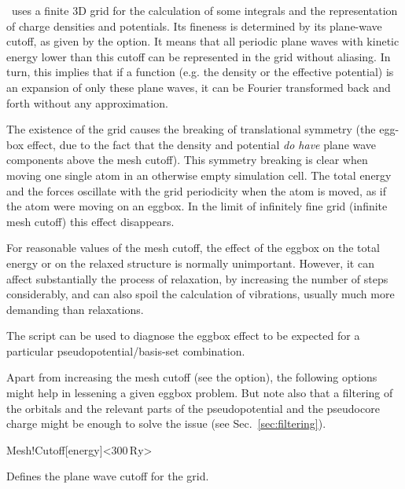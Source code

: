 \siesta\ uses a finite 3D grid for the calculation of some
integrals and the representation of charge densities and potentials.
Its fineness is determined by its plane-wave cutoff, as
given by the  option. It means that all periodic
plane waves with kinetic energy lower than this cutoff 
can be represented in the grid without aliasing. In turn,
this implies that if a function (e.g. the density or the 
effective potential) is an expansion of
only these plane waves, it can be Fourier transformed
back and forth without any approximation.

The existence of the grid causes the breaking of translational
symmetry (the egg-box effect, due to the fact that the density
and potential \emph{do have} plane wave components above
the mesh cutoff).  This symmetry breaking is clear when
moving one single atom in an otherwise empty simulation cell. The
total energy and the forces oscillate with the grid periodicity when
the atom is moved, as if the atom were moving on an eggbox. In the
limit of infinitely fine grid (infinite mesh cutoff) this effect
disappears.

For reasonable values of the mesh cutoff, the effect of the eggbox
on the total energy or on the relaxed structure is normally unimportant.
However, it can affect substantially the process of relaxation, by
increasing the number of steps considerably, and can also spoil the
calculation of vibrations, usually much more demanding than relaxations.

The  script can be used to
diagnose the eggbox effect to be expected for a particular
pseudopotential/basis-set combination.

Apart from increasing the mesh cutoff (see the  option),
the following options might help in lessening a given eggbox problem. But
note also that a filtering of the orbitals and the relevant parts of
the pseudopotential and the pseudocore charge might be enough to solve
the issue (see Sec.~\ref{sec:filtering}).

\begin{fdfentry}{Mesh!Cutoff}[energy]<$300\,\mathrm{Ry}$>

  Defines the plane wave cutoff for the grid.
  
 
\end{fdfentry}

